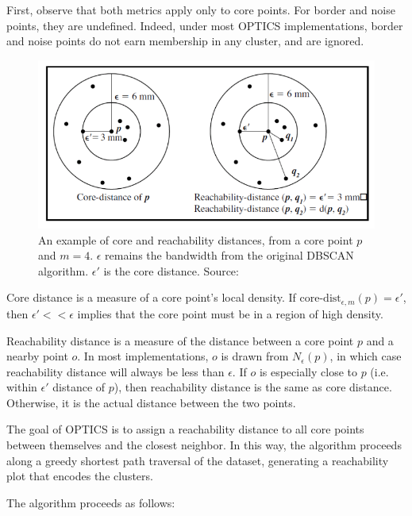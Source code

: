 First, observe that both metrics apply only to core points. For border and noise points, they are undefined. Indeed, under most OPTICS implementations, border and noise points do not earn membership in any cluster, and are ignored.

\begin{figure}[h]
\centering
\includegraphics[scale=0.42]{chapter_2/files/optics_distances.png}
\caption{An example of core and reachability distances, from a core point $p$ and $m=4$. $\epsilon$ remains the bandwidth from the original DBSCAN algorithm. $\epsilon'$ is the core distance. Source: \cite{medium:optics}}
\label{fig:optics}
\end{figure}

Core distance is a measure of a core point's local density. If $\text{core-dist}_{\epsilon, m}(p) = \epsilon'$, then $\epsilon' << \epsilon$ implies that the core point must be in a region of high density.

Reachability distance is a measure of the distance between a core point $p$ and a nearby point $o$. In most implementations, $o$ is drawn from $N_\epsilon(p)$, in which case reachability distance will always be less than $\epsilon$. If $o$ is especially close to $p$ (i.e. within $\epsilon'$ distance of $p$), then reachability distance is the same as core distance. Otherwise, it is the actual distance between the two points.

The goal of OPTICS is to assign a reachability distance to all core points between themselves and the closest neighbor. In this way, the algorithm proceeds along a greedy shortest path traversal of the dataset, generating a reachability plot that encodes the clusters.

The algorithm proceeds as follows:

